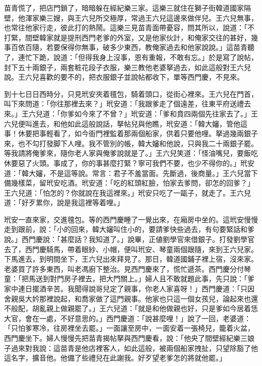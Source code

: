 苗青慌了，把店門鎖了，暗暗躲在經紀樂三家。這樂三就住在獅子街韓道國家隔壁，他渾家樂三嫂，與王六兒所交極厚，常過王六兒這邊來做伴兒。王六兒無事，也常往他家行走，彼此打的熱鬧。這樂三見苗青面帶憂容，問其所以，說道：「不打緊，間壁韓家就是提刑西門老爹的外室，又是他家伙計，和俺家交往的甚好，幾事百依百隨，若要保得你無事，破多少東西，教俺家過去和他家說說。」這苗青聽了，連忙下跪，說道：「但得我身上沒事，恩有重報，不敢有忘。」於是寫了說帖，封下五十兩銀子，兩套粧花段子衣服，樂三教他老婆拏過去，如此這般對王六兒說。王六兒喜歡的要不的，把衣服銀子並說帖都收下，單等西門慶，不見來。

到十七日日西時分，只見玳安夾着氊包，騎着頭口，從街心裡來。王六兒在門首，叫下來問道：「你往那裡去來？」玳安道：「我跟爹走了個遠差，往東平府送禮去來。」王六兒道：「你爹如今來了不曾？」玳安道：「爹和賁四兩個先往家去了。」王六兒便叫進去，和他如此這般說話，拏帖兒與他瞧，玳安道：「韓大嬸，管他這事！休要把事輕看了，如今衙門裡監着那兩個船家，供着只要他哩。拏過幾兩銀子來，也不勾打發脚下人哩。我不管別的帳，韓大嬸和他說，只與我二十兩銀子罷。等我請將俺爹來，隨你老人家與俺爹說就是了。」王六兒笑道：「怪油嘴兒，要飯吃休要惡了火頭。事成了，你的事甚麼打緊？寧可我們不要，也少不得你的。」玳安道：「韓大嬸，不是這等說。常言：君子不羞當面。先斷過，後商量。」王六兒當下備幾樣菜，留玳安吃酒。玳安道：「吃的紅頭紅臉，怕家去爹問，卻怎的回爹？」王六兒道：「怕怎的？你就說在我這裡來。」玳安只吃了一甌子，就走了。王六兒道：「好歹累你，說是我這裡等着哩。」

玳安一直來家，交進氊包。等的西門慶睡了一覺出來，在廂房中坐的。這玳安慢慢走到跟前，說：「小的回來，韓大嬸叫住小的，要請爹快些過去，有句要緊話和爹說。」西門慶說：「甚麼話？我知道了。」說畢，正値劉學官來借銀子。{}打發劉學官去了，西門慶騎馬，帶着眼紗、小帽，便叫玳安、琴童兩個跟隨，來到王六兒家。下馬進去，到明間坐下，王六兒出來拜見了。那日，韓道國鋪子裡上宿，沒來家。老婆買了許多東西，叫老馮廚下整治。見西門慶來了，慌忙遞茶。西門慶分付琴童：「把馬送到對門房子裡去，把大門關上。」婦人且不敢就題此事，先只說：「爹家中連日擺酒辛苦。我聞得說哥兒定了親事，你老人家喜呀！」西門慶道：「只因舍親吳大妗那裡說起，和喬家做了這門親事。他家也只這一個女孩兒，論起來也還不般配，胡亂親上做親罷了。」王六兒道：「就是和他做親也好，只是爹如今居着恁大官，會在一處，不好意思的。」西門慶道：「說甚麼哩！」說了一回，老婆道：「只怕爹寒冷，往房裡坐去罷。」一面讓至房中，一面安着一張椅兒，籠着火盆，西門慶坐下。婦人慢慢先把苗青揭帖拏與西門慶看，說：「他央了間壁經紀樂三娘子過來對我說：這苗青是他店裡客人，如此這般，被兩個船家拽扯，只望除豁了他這名字，擴音他。他備了些禮兒在此謝我。好歹望老爹怎的將就他罷。」

